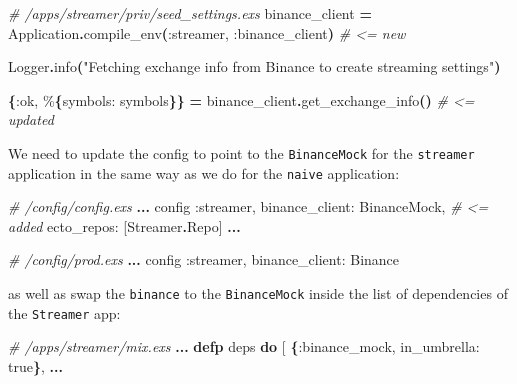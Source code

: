 \documentclass[
  oneside]{book}
\newenvironment{Shaded}{\begin{snugshade}}{\end{snugshade}}
\newcommand{\CommentTok}[1]{\textcolor[rgb]{0.56,0.35,0.01}{\textit{#1}}}
\newcommand{\ConstantTok}[1]{\textcolor[rgb]{0.56,0.35,0.01}{#1}}
\newcommand{\FunctionTok}[1]{\textcolor[rgb]{0.13,0.29,0.53}{\textbf{#1}}}
\newcommand{\KeywordTok}[1]{\textcolor[rgb]{0.13,0.29,0.53}{\textbf{#1}}}
\newcommand{\NormalTok}[1]{#1}
\newcommand{\OperatorTok}[1]{\textcolor[rgb]{0.81,0.36,0.00}{\textbf{#1}}}
\newcommand{\OtherTok}[1]{\textcolor[rgb]{0.56,0.35,0.01}{#1}}
\newcommand{\StringTok}[1]{\textcolor[rgb]{0.31,0.60,0.02}{#1}}
\newcommand{\VariableTok}[1]{\textcolor[rgb]{0.00,0.00,0.00}{#1}}
\begin{document}
\begin{Shaded}
\begin{Highlighting}[]
\CommentTok{\# /apps/streamer/priv/seed\_settings.exs}
\NormalTok{binance\_client }\OperatorTok{=} \ConstantTok{Application}\OperatorTok{.}\NormalTok{compile\_env}\FunctionTok{(}\VariableTok{:streamer}\NormalTok{, }\VariableTok{:binance\_client}\FunctionTok{)} \CommentTok{\# \textless{}= new}

\ConstantTok{Logger}\OperatorTok{.}\NormalTok{info}\FunctionTok{(}\StringTok{"Fetching exchange info from Binance to create streaming settings"}\FunctionTok{)}

\FunctionTok{\{}\VariableTok{:ok}\NormalTok{, \%}\FunctionTok{\{}\VariableTok{symbols:}\NormalTok{ symbols}\FunctionTok{\}\}} \OperatorTok{=}\NormalTok{ binance\_client}\OperatorTok{.}\NormalTok{get\_exchange\_info}\FunctionTok{()} \CommentTok{\# \textless{}= updated}
\end{Highlighting}
\end{Shaded}

We need to update the config to point to the \texttt{BinanceMock} for the \texttt{streamer} application in the same way as we do for the \texttt{naive} application:

\begin{Shaded}
\begin{Highlighting}[]
\CommentTok{\# /config/config.exs}
\OperatorTok{...}
\NormalTok{config }\VariableTok{:streamer}\NormalTok{,}
  \VariableTok{binance\_client:} \ConstantTok{BinanceMock}\NormalTok{, }\CommentTok{\# \textless{}= added}
  \VariableTok{ecto\_repos:} \OtherTok{[}\ConstantTok{Streamer}\OperatorTok{.}\ConstantTok{Repo}\OtherTok{]}
\OperatorTok{...}
\end{Highlighting}
\end{Shaded}

\begin{Shaded}
\begin{Highlighting}[]
\CommentTok{\# /config/prod.exs}
\OperatorTok{...}
\NormalTok{config }\VariableTok{:streamer}\NormalTok{,}
  \VariableTok{binance\_client:} \ConstantTok{Binance}
\end{Highlighting}
\end{Shaded}

as well as swap the \texttt{binance} to the \texttt{BinanceMock} inside the list of dependencies of the \texttt{Streamer} app:

\begin{Shaded}
\begin{Highlighting}[]
\CommentTok{\# /apps/streamer/mix.exs}
\OperatorTok{...}
  \KeywordTok{defp}\NormalTok{ deps }\KeywordTok{do}
    \OtherTok{[}
      \FunctionTok{\{}\VariableTok{:binance\_mock}\NormalTok{, }\VariableTok{in\_umbrella:} \ConstantTok{true}\FunctionTok{\}}\NormalTok{,}
      \OperatorTok{...}
\end{Highlighting}
\end{Shaded}
\end{document}
